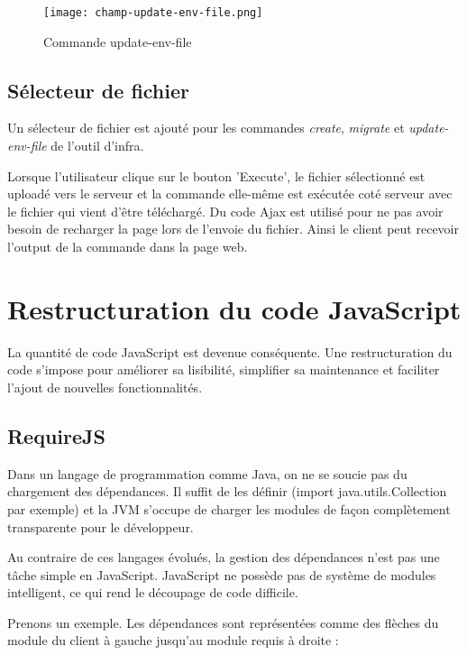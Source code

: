 \begin{figure}[H]
  \begin{center}
    \texttt{[image: champ-update-env-file.png]} 
  \end{center}
  \caption{Commande update-env-file} 
\end{figure}

\subsection{Sélecteur de fichier}

Un sélecteur de fichier est ajouté pour les commandes \textit{create},
\textit{migrate} et \textit{update-env-file} de l'outil d'infra.

Lorsque l'utilisateur clique sur le bouton 'Execute', le fichier sélectionné est
uploadé vers le serveur et la commande elle-même est exécutée coté serveur avec
le fichier qui vient d'être téléchargé.
Du code Ajax est utilisé pour ne pas avoir besoin de recharger la page lors de
l'envoie du fichier.
Ainsi le client peut recevoir l'output de la commande dans la page web.

 \section{Restructuration du code JavaScript}
 
 La quantité de code JavaScript est devenue conséquente. Une restructuration du
 code s'impose pour améliorer sa lisibilité, simplifier sa maintenance et
 faciliter l'ajout de nouvelles fonctionnalités.

\subsection{RequireJS}

Dans un langage de programmation comme Java, on ne se soucie pas du chargement
des dépendances. Il suffit de les définir (import java.utils.Collection par
exemple) et la JVM s'occupe de charger les modules de façon complètement
transparente pour le développeur.

Au contraire de ces langages évolués, la gestion des dépendances n'est pas
une tâche simple en JavaScript.
JavaScript ne possède pas de système de modules intelligent, ce qui rend le
découpage de code difficile.

Prenons un exemple. Les dépendances sont représentées comme des flèches du
module du client à gauche jusqu'au module requis à droite :


